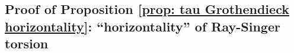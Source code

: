 \documentclass[11pt,a4paper]{amsart}
\theoremstyle{plain} %
\newtheorem{prop}[thm]{Proposition}
\theoremstyle{definition}
\theoremstyle{remark}
\newcommand{\g}{\mathfrak{g}}
\newcommand{\til}{\widetilde}
\begin{document}

\subsection{Proof of Proposition \ref{prop: tau Grothendieck horizontality}: ``horizontality'' of Ray-Singer torsion}
\label{Appendix: proof of Prop 4.4}
\end{document}
